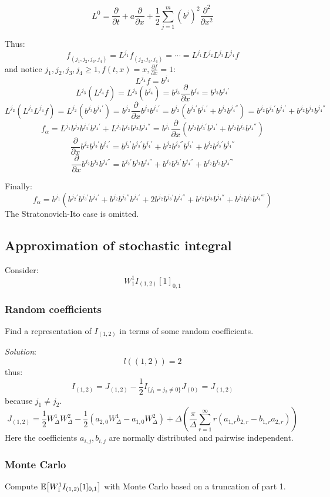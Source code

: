 \documentclass{article}
\begin{document}
$$
    L^0 = \frac{\partial}{\partial t} + a\frac{\partial}{\partial x} + \frac12\sum_{j=1}^m (b^j)^2\frac{\partial^2}{\partial x^2}
$$

Thus:
$$
    f_{(j_1,j_2,j_3,j_4)} = L^{j_1}f_{(j_2,j_3,j_4)} = \cdots = L^{j_1}L^{j_2}L^{j_3}L^{j_4}f
$$ and notice $j_1,j_2,j_3,j_4\ge 1, f(t,x)=x, \frac{\partial f}{\partial x} = 1$:
$$
    L^{j_4}f = b^{j_4}
$$
$$
    L^{j_3}(L^{j_4}f) = L^{j_3}(b^{j_4}) = b^{j_3}\frac{\partial}{\partial x}b^{j_4} = b^{j_3}b^{j_4'}
$$
$$
    L^{j_2}(L^{j_3}L^{j_4}f) = L^{j_2}(b^{j_3}b^{j_4'}) = b^{j_2}\frac{\partial}{\partial x}b^{j_3}b^{j_4'} = b^{j_2}(b^{j_3'}b^{j_4'} + b^{j_3}b^{j_4''}) = b^{j_2}b^{j_3'}b^{j_4'} + b^{j_2}b^{j_3}b^{j_4''}
$$
$$
    f_{\alpha} = L^{j_1}b^{j_2}b^{j_3'}b^{j_4'} + L^{j_1}b^{j_2}b^{j_3}b^{j_4''} = b^{j_1}\frac{\partial}{\partial x}(b^{j_2}b^{j_3'}b^{j_4'}+b^{j_2}b^{j_3}b^{j_4''})
$$
$$
    \frac{\partial}{\partial x}b^{j_2}b^{j_3'}b^{j_4'} = b^{j_2'}b^{j_3'}b^{j_4'} + b^{j_2}b^{j_3''}b^{j_4'} +b^{j_2}b^{j_3'}b^{j_4''} 
$$
$$
    \frac{\partial}{\partial x}b^{j_2}b^{j_3}b^{j_4''} = b^{j_2'}b^{j_3}b^{j_4''} + b^{j_2}b^{j_3'}b^{j_4''} + b^{j_2}b^{j_3}b^{j_4'''}
$$

Finally:
$$
    f_{\alpha} = b^{j_1}(b^{j_2'}b^{j_3'}b^{j_4'} + b^{j_2}b^{j_3''}b^{j_4'} + 2b^{j_2}b^{j_3'}b^{j_4''} + b^{j_2}b^{j_3}b^{j_4''} + b^{j_2}b^{j_3}b^{j_4'''})
$$ The Stratonovich-Ito case is omitted.

\subsection{Approximation of stochastic integral} Consider:
$$
    W_1^1I_{(1,2)}[1]_{0,1}
$$
\subsubsection{Random coefficients} Find a representation of $I_{(1,2)}$ in terms of some random coefficients.

\emph{Solution}: 
$$
    l((1,2)) = 2
$$ thus:
$$
    I_{(1,2)} = J_{(1,2)} - \frac12I_{\{j_1=j_2\neq 0\}}J_{(0)} = J_{(1,2)}
$$ because $j_1\neq j_2$.
$$
    J_{(1,2)} = \frac12W_{\Delta}^{1}W_{\Delta}^2-\frac12(a_{2,0}W^1_{\Delta} - a_{1,0}W_{\Delta}^2) + \Delta(\frac{\pi}{\Delta}\sum_{r=1}^{\infty} r(a_{1,r}b_{2,r} - b_{1,r}a_{2,r}))
$$ Here the coefficients $a_{i,j}, b_{i,j}$ are normally distributed and pairwise independent.

\subsubsection{Monte Carlo} Compute $\mathbb{E}\big[ {W_1^1I_{(1,2)}[1]_{0,1}} \big]$ with Monte Carlo based on a truncation of part 1.
\end{document}
